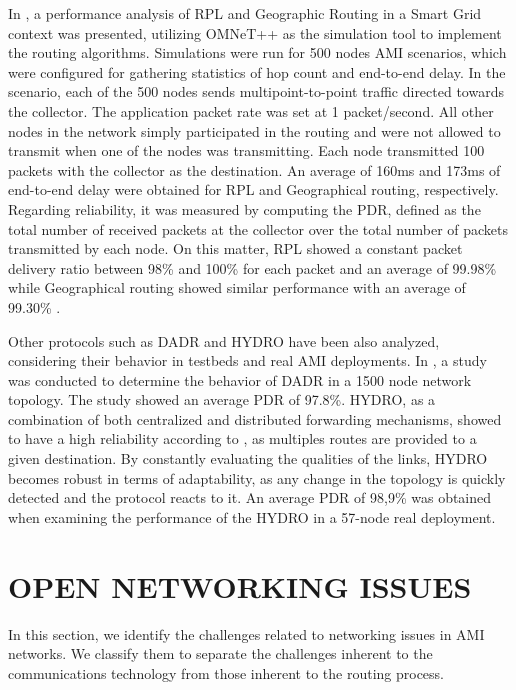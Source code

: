 \documentclass[10pt,twocolumn,twoside,submit]{JCNtran}
\begin{document}
In \cite{Iyer2011a}, a performance analysis of RPL and Geographic Routing in a Smart Grid context was presented, utilizing OMNeT++ as the simulation tool to implement the routing algorithms. Simulations were run for 500 nodes AMI scenarios, which were configured for gathering statistics of hop count and end-to-end delay.  In the scenario, each of the 500 nodes sends multipoint-to-point traffic directed towards the collector. The application packet rate was set at 1 packet/second. All other nodes in the network simply participated in the routing and were not allowed to transmit when one of the nodes was transmitting. Each node transmitted 100 packets with the collector as the destination. An average of 160ms and 173ms of end-to-end delay were obtained for RPL and Geographical routing, respectively. Regarding reliability, it was measured by computing the PDR, defined as the total number of received packets at the collector over the total number of packets transmitted by each node. On this matter, RPL showed a constant packet delivery ratio between 98\% and 100\% for each packet and an average of 99.98\% while Geographical routing showed similar performance with an average of 99.30\% \cite{Iyer2011a}.  

Other protocols such as DADR and HYDRO have been also analyzed, considering their behavior in testbeds and real AMI deployments. In \cite{Iwao2010}, a study was conducted to determine the behavior of DADR in a 1500 node network topology. The study showed an average PDR of 97.8\%. HYDRO, as a combination of both centralized and distributed forwarding mechanisms, showed to have a high reliability according to \cite{Dawson2010}, as multiples routes are provided to a given destination.  By constantly evaluating the qualities of the links, HYDRO becomes robust in terms of adaptability, as any change in the topology is quickly detected and the protocol reacts to it. An average PDR of 98,9\% was obtained when examining the performance of the HYDRO in a 57-node real deployment. 

\vspace{10pt}
\section{\uppercase{Open Networking Issues}}
\label{sec:issues}

In this section, we identify the challenges related to networking issues in AMI networks. We classify them to separate the challenges inherent to the communications technology from those inherent to the routing process.
\end{document}
